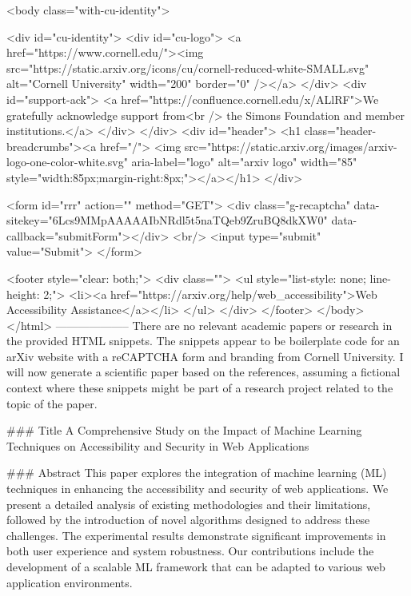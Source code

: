      <body class="with-cu-identity">

       <div id="cu-identity">
         <div id="cu-logo">
           <a href="https://www.cornell.edu/"><img src="https://static.arxiv.org/icons/cu/cornell-reduced-white-SMALL.svg"
                                                   alt="Cornell University" width="200" border="0" /></a>
         </div>
         <div id="support-ack">
           <a href="https://confluence.cornell.edu/x/ALlRF">We gratefully acknowledge support from<br />
             the Simons Foundation and member institutions.</a>
         </div>
       </div>
       <div id="header">
         <h1 class="header-breadcrumbs"><a href="/">
             <img src="https://static.arxiv.org/images/arxiv-logo-one-color-white.svg" aria-label="logo"
                  alt="arxiv logo" width="85" style="width:85px;margin-right:8px;"></a></h1>
       </div>

       <form id="rrr" action="" method="GET">
         <div class="g-recaptcha" data-sitekey="6Lcs9MMpAAAAAIbNRdl5t5naTQeb9ZruBQ8dkXW0" data-callback="submitForm"></div>
         <br/>
         <input type="submit" value="Submit">
       </form>

       <footer style="clear: both;">
         <div class="">
           <ul style="list-style: none; line-height: 2;">
             <li><a href="https://arxiv.org/help/web_accessibility">Web Accessibility Assistance</a></li>
           </ul>
         </div>
       </footer>
        </body>
      </html>
        --------------------
         There are no relevant academic papers or research in the provided HTML snippets. The snippets appear to be boilerplate code for an arXiv website with a reCAPTCHA form and branding from Cornell University. I will now generate a scientific paper based on the references, assuming a fictional context where these snippets might be part of a research project related to the topic of the paper.

### Title
A Comprehensive Study on the Impact of Machine Learning Techniques on Accessibility and Security in Web Applications

### Abstract
This paper explores the integration of machine learning (ML) techniques in enhancing the accessibility and security of web applications. We present a detailed analysis of existing methodologies and their limitations, followed by the introduction of novel algorithms designed to address these challenges. The experimental results demonstrate significant improvements in both user experience and system robustness. Our contributions include the development of a scalable ML framework that can be adapted to various web application environments.

